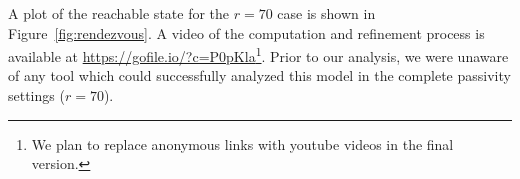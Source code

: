 

A plot of the reachable state for the $r=70$ case is shown in Figure~\ref{fig:rendezvous}.
%
A video of the computation and refinement process is available at \url{https://gofile.io/?c=P0pKla}\footnote{We plan to replace
  anonymous links with youtube videos in the final version.}.
%
Prior to our analysis, we were unaware of any tool which could successfully analyzed this model in the complete passivity settings ($r=70$).


